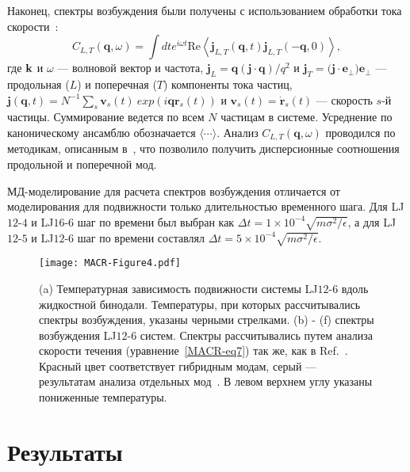 Наконец, спектры возбуждения были получены с использованием обработки тока скорости~\cite{10.1063/1.5050708}:
\begin{equation}
    C_{L, T}(\mathbf{q}, \omega)=\int dt e^{i \omega t} \text{Re} \left\langle\mathbf{j}_{L, T}(\mathbf{q}, t) \mathbf{j}_{L, T}(-\mathbf{q}, 0)\right\rangle,
    \label{MACR-eq7}
\end{equation}
где ${\bf k}$ и $\omega$ — волновой вектор и частота,
$\mathbf{j}_{L}=\mathbf{q}(\mathbf{j} \cdot \mathbf{q} ) / q^{2}$ и $\mathbf{j}_{T}=(\mathbf{j \cdot e_{\perp})e_{\perp}}$ — продольная ($L$) и поперечная ($T$) компоненты тока частиц,\\
$\mathbf{j}(\mathbf{q}, t)=N^{-1} \sum_{s} \mathbf{v}_{s}(t) \ exp \left(i \mathbf{q} \mathbf{r}_{s}(t)\right)$ и $\mathbf{v}_{s}(t)=\dot{\mathbf{r} }_{s}(t)$ — скорость $s$-й частицы.
Суммирование ведется по всем $N$ частицам в системе. Усреднение по каноническому ансамблю обозначается $\langle\cdots\rangle$. Анализ $C_{L, T}(\mathbf{q}, \omega)$ проводился по методикам, описанным в~\cite{10.1038/s41598-019-46979-y}, что позволило получить дисперсионные соотношения продольной и поперечной мод.

МД-моделирование для расчета спектров возбуждения отличается от моделирования для подвижности только длительностью временного шага. Для LJ$12$-$4$ и LJ$16$-$6$ шаг по времени был выбран как $\Delta t = 1 \times 10 ^ {-4} \sqrt {m \sigma ^ 2 / \epsilon}$, а для LJ$12$-$5$ и LJ$12$-$6$ шаг по времени составлял $\Delta t = 5 \times 10 ^ {-4} \sqrt {m \sigma ^ 2 / \epsilon}$.

\begin{figure}[!t]
\centering
 \texttt{[image: MACR-Figure4.pdf]}
 \caption{(a) Температурная зависимость подвижности системы LJ$12$-$6$ вдоль жидкостной бинодали.
  Температуры, при которых рассчитывались спектры возбуждения, указаны черными стрелками.
  (b) - (f) спектры возбуждения LJ$12$-$6$ систем.
Спектры рассчитывались путем анализа скорости течения (уравнение~\eqref{MACR-eq7}) так же, как в Ref.~\cite{10.1038/s41598-019-46979-y}.
  Красный цвет соответствует гибридным модам, серый — результатам анализа отдельных мод~\cite{10.1038/s41598-019-46979-y}.
  В левом верхнем углу указаны пониженные температуры.}
\label{MACR-Figure4}
\end{figure}

\section{Результаты}
\label{MACR-SecResults}

